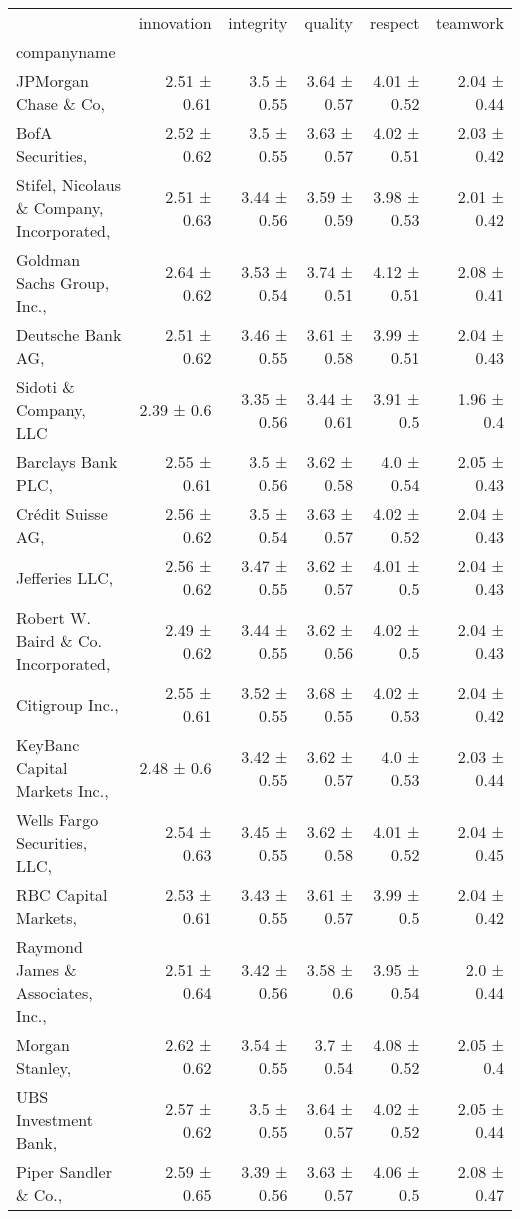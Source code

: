 \begin{tabular}{lrrrrr}
\toprule
 & innovation & integrity & quality & respect & teamwork \\
companyname &  &  &  &  &  \\
\midrule
JPMorgan Chase \& Co,  & 2.51 ± 0.61 & 3.5 ± 0.55 & 3.64 ± 0.57 & 4.01 ± 0.52 & 2.04 ± 0.44 \\
BofA Securities,  & 2.52 ± 0.62 & 3.5 ± 0.55 & 3.63 ± 0.57 & 4.02 ± 0.51 & 2.03 ± 0.42 \\
Stifel, Nicolaus \& Company, Incorporated,  & 2.51 ± 0.63 & 3.44 ± 0.56 & 3.59 ± 0.59 & 3.98 ± 0.53 & 2.01 ± 0.42 \\
Goldman Sachs Group, Inc.,  & 2.64 ± 0.62 & 3.53 ± 0.54 & 3.74 ± 0.51 & 4.12 ± 0.51 & 2.08 ± 0.41 \\
Deutsche Bank AG,  & 2.51 ± 0.62 & 3.46 ± 0.55 & 3.61 ± 0.58 & 3.99 ± 0.51 & 2.04 ± 0.43 \\
Sidoti \& Company, LLC & 2.39 ± 0.6 & 3.35 ± 0.56 & 3.44 ± 0.61 & 3.91 ± 0.5 & 1.96 ± 0.4 \\
Barclays Bank PLC,  & 2.55 ± 0.61 & 3.5 ± 0.56 & 3.62 ± 0.58 & 4.0 ± 0.54 & 2.05 ± 0.43 \\
Cr\'edit Suisse AG,  & 2.56 ± 0.62 & 3.5 ± 0.54 & 3.63 ± 0.57 & 4.02 ± 0.52 & 2.04 ± 0.43 \\
Jefferies LLC,  & 2.56 ± 0.62 & 3.47 ± 0.55 & 3.62 ± 0.57 & 4.01 ± 0.5 & 2.04 ± 0.43 \\
Robert W. Baird \& Co. Incorporated,  & 2.49 ± 0.62 & 3.44 ± 0.55 & 3.62 ± 0.56 & 4.02 ± 0.5 & 2.04 ± 0.43 \\
Citigroup Inc.,  & 2.55 ± 0.61 & 3.52 ± 0.55 & 3.68 ± 0.55 & 4.02 ± 0.53 & 2.04 ± 0.42 \\
KeyBanc Capital Markets Inc.,  & 2.48 ± 0.6 & 3.42 ± 0.55 & 3.62 ± 0.57 & 4.0 ± 0.53 & 2.03 ± 0.44 \\
Wells Fargo Securities, LLC,  & 2.54 ± 0.63 & 3.45 ± 0.55 & 3.62 ± 0.58 & 4.01 ± 0.52 & 2.04 ± 0.45 \\
RBC Capital Markets,  & 2.53 ± 0.61 & 3.43 ± 0.55 & 3.61 ± 0.57 & 3.99 ± 0.5 & 2.04 ± 0.42 \\
Raymond James \& Associates, Inc.,  & 2.51 ± 0.64 & 3.42 ± 0.56 & 3.58 ± 0.6 & 3.95 ± 0.54 & 2.0 ± 0.44 \\
Morgan Stanley,  & 2.62 ± 0.62 & 3.54 ± 0.55 & 3.7 ± 0.54 & 4.08 ± 0.52 & 2.05 ± 0.4 \\
UBS Investment Bank,  & 2.57 ± 0.62 & 3.5 ± 0.55 & 3.64 ± 0.57 & 4.02 ± 0.52 & 2.05 ± 0.44 \\
Piper Sandler \& Co.,  & 2.59 ± 0.65 & 3.39 ± 0.56 & 3.63 ± 0.57 & 4.06 ± 0.5 & 2.08 ± 0.47 \\

\end{tabular}
